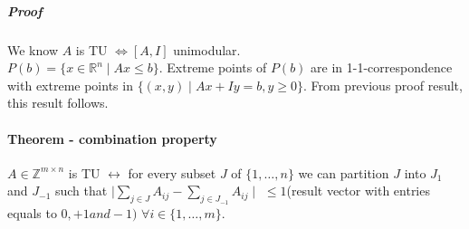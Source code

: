 \documentclass[main]{subfiles}
\begin{document}
\subparagraph{Proof}
We know $A$ is TU $\iff [A,I]$ unimodular.\\
$P(b) = \{x \in \mathbb{R}^{n} \mid Ax \leq b \}$. Extreme points of $P(b)$ are
in 1-1-correspondence with extreme points in $\{(x,y) \mid Ax + Iy = b, y \geq
0 \}$. From previous proof result, this result follows.

\paragraph{Theorem - combination property} $A \in \mathbb{Z}^{m \times n}$ is
TU $\leftrightarrow$ for every subset $J$ of $\{1, \dots, n\}$ we can partition
$J$ into $J_{1}$ and $J_{-1}$ such that $\mid \sum_{j \in J} A_{ij} -
\sum_{j \in J_{-1}} A_{ij} \mid$ $\leq 1$(result vector with entries equals to
$0, +1 and -1)$ $\forall i \in \{1, \dots, m\}$.
\end{document}
